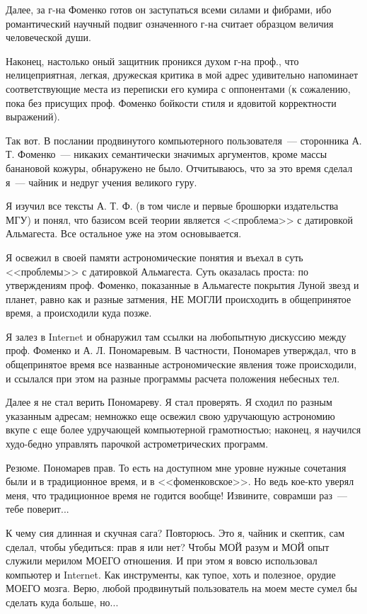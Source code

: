 \documentclass{scrbook}
\newcommand{\flqq}{<<}
\newcommand{\frqq}{>>}
\newcommand{\mdash}{~--- }
\begin{document}
Далее, за г-на Фоменко готов он заступаться всеми силами и фибрами, ибо романтический научный подвиг означенного г-на считает образцом величия человеческой души. 

Наконец, настолько оный защитник проникся духом г-на проф., что нелицеприятная, легкая, дружеская критика в мой адрес удивительно напоминает соответствующие места из переписки его кумира с оппонентами (к сожалению, пока без присущих проф. Фоменко бойкости стиля и ядовитой корректности выражений).

Так вот. В послании продвинутого компьютерного пользователя{\mdash}сторонника А. Т. Фоменко{\mdash}никаких семантически значимых аргументов, кроме массы банановой кожуры, обнаружено не было. Отчитываюсь, что за это время сделал я{\mdash}чайник и недруг учения великого гуру.

Я изучил все тексты А. Т. Ф. (в том числе и первые брошюрки издательства МГУ) и понял, что базисом всей теории является {\flqq}проблема{\frqq} с датировкой Альмагеста. Все остальное уже на этом основывается. 

Я освежил в своей памяти астрономические понятия и въехал в суть {\flqq}проблемы{\frqq} с датировкой Альмагеста. Суть оказалась проста: по утверждениям проф. Фоменко, показанные в Альмагесте покрытия Луной звезд и планет, равно как и разные затмения, НЕ МОГЛИ происходить в общепринятое время, а происходили куда позже.

Я залез в Internet и обнаружил там ссылки на любопытную дискуссию между проф. Фоменко и А. Л. Пономаревым. В частности, Пономарев утверждал, что в общепринятое время все названные астрономические явления тоже происходили, и ссылался при этом на разные программы расчета положения небесных тел.

Далее я не стал верить Пономареву. Я стал проверять. Я сходил по разным указанным адресам; немножко еще освежил свою удручающую астрономию вкупе с еще более удручающей компьютерной грамотностью; наконец, я научился худо-бедно управлять парочкой астрометрических программ.

Резюме. Пономарев прав. То есть на доступном мне уровне нужные сочетания были и в традиционное время, и в {\flqq}фоменковское{\frqq}. Но ведь кое-кто уверял меня, что традиционное время не годится вообще! Извините, соврамши раз{\mdash}тебе поверит...

К чему сия длинная и скучная сага? Повторюсь. Это я, чайник и скептик, сам сделал, чтобы убедиться: прав я или нет? Чтобы МОЙ разум и МОЙ опыт служили мерилом МОЕГО отношения. И при этом я вовсю использовал компьютер и Internet. Как инструменты, как тупое, хоть и полезное, орудие МОЕГО мозга. Верю, любой продвинутый пользователь на моем месте сумел бы сделать куда больше, но...
\end{document}
